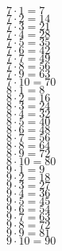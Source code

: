 \documentclass{article}
\begin{document}
\begin{multicols}{3}
\noindent
$7 \cdot 1 = 7$ \\
$7 \cdot 2 = 14$ \\
$7 \cdot 3 = 21$ \\
$7 \cdot 4 = 28$ \\
$7 \cdot 5 = 35$ \\
$7 \cdot 6 = 42$ \\
$7 \cdot 7 = 49$ \\
$7 \cdot 8 = 56$ \\
$7 \cdot 9 = 63$ \\
$7 \cdot 10= 70$ \\

\noindent
$8 \cdot 1 = 8$ \\
$8 \cdot 2 = 16$ \\
$8 \cdot 3 = 24$ \\
$8 \cdot 4 = 32$ \\
$8 \cdot 5 = 40$ \\
$8 \cdot 6 = 48$ \\
$8 \cdot 7 = 56$ \\
$8 \cdot 8 = 64$ \\
$8 \cdot 9 = 72$ \\
$8 \cdot 10 = 80$ \\

\noindent
$9 \cdot 1 = 9$ \\
$9 \cdot 2 = 18$ \\
$9 \cdot 3 = 27$ \\
$9 \cdot 4 = 36$ \\
$9 \cdot 5 = 45$ \\
$9 \cdot 6 = 54$ \\
$9 \cdot 7 = 63$ \\
$9 \cdot 8 = 72$ \\
$9 \cdot 9 = 81$ \\
$9 \cdot 10 = 90$ \\
\end{multicols}
\end{document}
